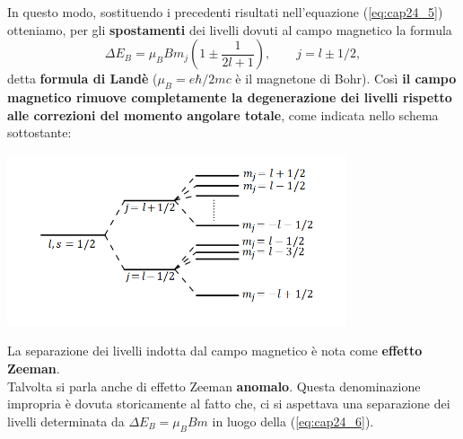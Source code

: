 In questo modo, sostituendo i precedenti risultati nell'equazione (\ref{eq:cap24_5}) otteniamo, per gli \textbf{spostamenti} dei livelli dovuti al campo magnetico la formula
\begin{equation} \label{eq:cap24_6}
\Delta E_B= \mu_B B m_j \left( 1\pm \frac{1}{2l+1}\right), \qquad j=l\pm 1/2 ,
\end{equation}
detta \textbf{formula di Landè} ($\mu_B=e\hbar /2mc$ è il magnetone di Bohr).
Così \textbf{il campo magnetico rimuove completamente la degenerazione dei livelli rispetto alle correzioni del momento angolare totale}, come indicata nello schema sottostante: 
\begin{center}
\includegraphics[width=10cm]{immagini/cap_24/fig24_1.png}
\end{center}

La separazione dei livelli indotta dal campo magnetico è nota come \textbf{effetto Zeeman}. \\
Talvolta si parla anche di effetto Zeeman \textbf{anomalo}. Questa denominazione impropria è dovuta storicamente al fatto che, ci si aspettava una separazione dei livelli determinata da $\Delta E_B=\mu_BBm$ in luogo della (\ref{eq:cap24_6}).

